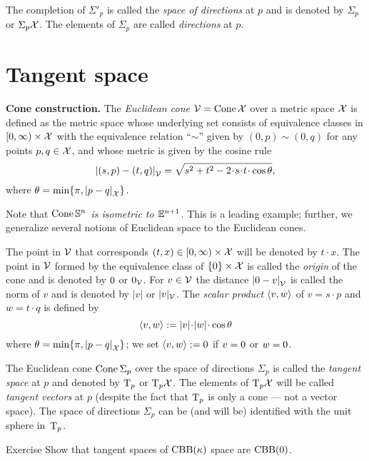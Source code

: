 The completion of $\Sigma'_p$ is called the \emph{space of directions} at $p$ and is denoted by $\Sigma_p$ or $\Sigma_p\mathcal{X}$.
The elements of $\Sigma_p$ are called \emph{directions} at $p$.

\section{Tangent space}\label{sec: tangent space}

\textbf{Cone construction.}
The \emph{Euclidean cone} $\mathcal{V}=\mathop{\rm Cone}\nolimits\mathcal{X}$ 
over a metric space $\mathcal{X}$
is defined as the metric space whose underlying set consists of
equivalence classes in
$[0,\infty)\times \mathcal{X}$ with the equivalence relation ``$\sim$'' given by $(0,p)\sim (0,q)$ for any points $p,q\in\mathcal{X}$,
and whose metric is given by the cosine rule
\[
\dist{(s,p)}{(t,q)}{\spc{V}} 
=
\sqrt{s^2+t^2-2\cdot s\cdot t\cdot \cos\theta},
\]
where $\theta= \min\{\pi, \dist{p}{q}{\spc{X}}\}$.

Note that \textit{$\mathop{\rm Cone}\nolimits\mathbb{S}^n$ is isometric to $\mathbb{E}^{n+1}$.}
This is a leading example;
further, we generalize several notions of Euclidean space to the Euclidean cones. 

The point in $\mathcal{V}$ that corresponds $(t,x)\z\in[0,\infty)\times \spc{X}$ will be denoted by $t\cdot x$.
The point in $\mathcal{V}$ formed by the equivalence class of $\{0\}\times\mathcal{X}$ is called the \emph{origin} of the cone and is denoted by $0$ or $0_{\mathcal{V}}$.
For $v\in\mathcal{V}$ the distance $\dist{\0}{v}{\spc{V}}$ is called the norm of $v$ and is denoted by $|v|$ or $|v|_{\mathcal{V}}$.
The \emph{scalar product} $\langle v,w\rangle$
of $v=s\cdot p$ and $w=t\cdot q$
is defined by 
\[\<v,w\>
\df |v|\cdot|w|\cdot\cos\theta
\]
where $\theta= \min\{\pi, \dist{p}{q}{\spc{X}}\}$; we set $\langle v,w\rangle\mathrel{:=}0$ if $v=0$ or $w=0$.

The Euclidean cone $\mathop{\rm Cone}\nolimits\Sigma_p$ over the space of directions $\Sigma_p$ is called the \emph{tangent space} at $p$ and denoted by $\mathrm{T}_p$ or $\mathrm{T}_p\mathcal{X}$.
The elements of $\mathrm{T}_p\mathcal{X}$ will be called \emph{tangent vectors} at $p$
(despite the fact that $\mathrm{T}_p$ is only a cone --- not a vector space).
The space of directions $\Sigma_p$ can be (and will be) identified with the unit sphere in~$\mathrm{T}_p$.

\begin{thm}{Exercise}\label{ex:Tan-is-CBB(0)}
Show that tangent spaces of $\mathrm{CBB}(\kappa)$ space are $\mathrm{CBB}(0)$.

\end{thm}


